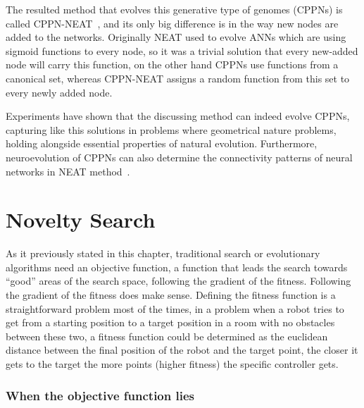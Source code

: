 The resulted method that evolves this generative type of genomes (CPPNs) is called CPPN-NEAT~\cite{stanley2007compositional}, and its only big difference is in the way new nodes are added to the networks. Originally NEAT used to evolve ANNs which are using sigmoid functions to every node, so it was a trivial solution that every new-added node will carry this function, on the other hand CPPNs use functions from a canonical set, whereas CPPN-NEAT assigns a random function from this set to every newly added node.

Experiments have shown that the discussing method can indeed evolve CPPNs, capturing like this solutions in problems where geometrical nature problems, holding alongside essential properties of natural evolution. Furthermore, neuroevolution of CPPNs can also determine the connectivity patterns of neural networks in NEAT method~\cite{stanley2009hypercube}.




\section{Novelty Search}

As it previously stated in this chapter, traditional search or evolutionary algorithms need an objective function, a function that leads the search towards ``good'' areas of the search space, following the gradient of the fitness. Following the gradient of the fitness does make sense. Defining the fitness function is a straightforward problem most of the times, in a problem when a robot tries to get from a starting position to a target position in a room with no obstacles between these two, a fitness function could be determined as the euclidean distance between the final position of the robot and the target point, the closer it gets to the target the more points (higher fitness) the specific controller gets.

\subsubsection*{When the objective function lies}



